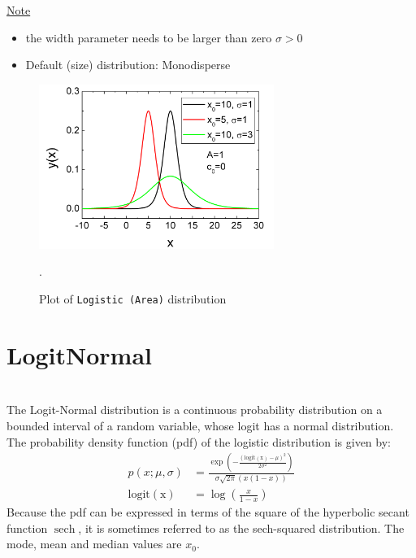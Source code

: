 \uline{Note}
\begin{itemize}
  \item the width parameter needs to be larger than zero $\sigma > 0$
  \item Default (size) distribution: Monodisperse
\end{itemize}

\begin{figure}[htb]
\begin{center}
\includegraphics[width=0.6824\textwidth]{LogisticArea.png}
\end{center}
\caption{Plot of \texttt{Logistic (Area)} distribution}.
\label{fig:LogisticArea}
\end{figure}

\clearpage
















\section{LogitNormal} ~\\
\label{sec:Logit}
The Logit-Normal distribution is a continuous
probability distribution on a bounded interval of a random variable, whose logit has a normal distribution.  The probability
density function (pdf) of the logistic  distribution is given by:
\begin{align}
p(x; \mu,\sigma) &= \frac{\exp\left(-\frac{\left(\operatorname{logit(x)}-\mu\right)^2}{2\sigma^2}\right)} {\sigma\sqrt{2\pi}\left(x(1-x)\right)} \\
\operatorname{logit(x)} &= \log\left(\frac{x}{1-x}\right)
\end{align}
Because the pdf can be expressed in terms of the square of the
hyperbolic secant function $\operatorname{sech}$, it is sometimes referred to as
the sech-squared distribution. The mode, mean and median values are $x_0$.
\vspace{1cm}

